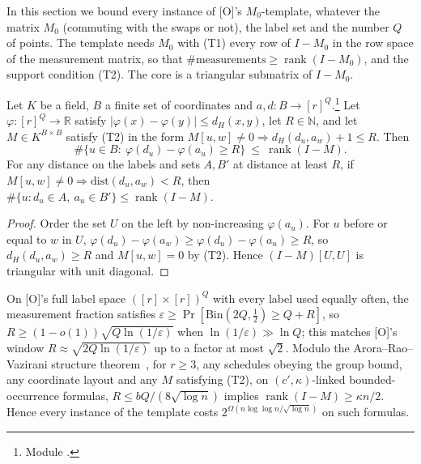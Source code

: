 \documentclass[10pt]{amsart}
\theoremstyle{plain}
\theoremstyle{definition}
\theoremstyle{remark}
\numberwithin{equation}{section}
\newcommand{\Oa}{\textup{[O]}}
\newcommand{\N}{\mathbb{N}}
\newcommand{\rk}{\operatorname{rank}}
\begin{document}
In this section we bound every instance of \Oa's $M_0$-template, whatever the matrix $M_0$
(commuting with the swaps or not), the label set and the number $Q$ of points. The template needs
$M_0$ with (T1) every row of $I-M_0$ in the row space of the measurement matrix, so that
$\#\text{measurements}\ge\rk(I-M_0)$, and the support condition (T2). The core is a triangular
submatrix of $I-M_0$.

\begin{theorem}\label{thm:triangular}
Let $K$ be a field, $B$ a finite set of coordinates and $a,d:B\to[r]^Q$.\footnote{Module
.} Let $\varphi:[r]^Q\to\mathbb R$ satisfy
$|\varphi(x)-\varphi(y)|\le d_H(x,y)$, let $R\in\N$, and let $M\in K^{B\times B}$ satisfy (T2) in the form
$M[u,w]\ne0\Rightarrow d_H(d_u,a_w)+1\le R$. Then
\[
  \#\{u\in B:\ \varphi(d_u)-\varphi(a_u)\ge R\}\ \le\ \rk(I-M).
\]
For any distance on the labels and sets $A,B'$ at distance at least $R$, if
$M[u,w]\ne0\Rightarrow\mathrm{dist}(d_u,a_w)<R$, then $\#\{u:d_u\in A,\ a_u\in B'\}\le\rk(I-M)$.
\end{theorem}
\begin{proof}
Order the set $U$ on the left by non-increasing $\varphi(a_u)$. For $u$ before or equal to $w$ in $U$,
$\varphi(d_u)-\varphi(a_w)\ge\varphi(d_u)-\varphi(a_u)\ge R$, so $d_H(d_u,a_w)\ge R$ and $M[u,w]=0$ by (T2).
Hence $(I-M)[U,U]$ is triangular with unit diagonal.
\end{proof}

\begin{proposition}\label{prop:template}
On \Oa's full label space $([r]\times[r])^Q$ with every label used equally often, the measurement
fraction satisfies $\varepsilon\ge\Pr[\mathrm{Bin}(2Q,\tfrac12)\ge Q+R]$, so
$R\ge(1-o(1))\sqrt{Q\ln(1/\varepsilon)}$ when $\ln(1/\varepsilon)\gg\ln Q$; this matches \Oa's window
$R\approx\sqrt{2Q\ln(1/\varepsilon)}$ up to a factor at most $\sqrt2$. Modulo the Arora--Rao--Vazirani
structure theorem~\cite{ARV09}, for $r\ge3$, any schedules obeying the group bound, any coordinate
layout and any $M$ satisfying (T2), on $(c',\kappa)$-linked bounded-occurrence formulas,
$R\le bQ/(8\sqrt{\log n})$ implies $\rk(I-M)\ge\kappa n/2$. Hence every instance of the template costs
$2^{\Omega(n\log\log n/\sqrt{\log n})}$ on such formulas.
\end{proposition}
\end{document}

